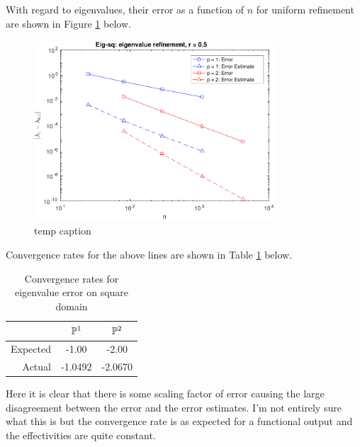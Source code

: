 \documentclass{article}
\begin{document}
\begin{itemize}
	
	With regard to eigenvalues, their error as a function of \(n\) for uniform refinement are shown in Figure \ref{templabel2} below.
	\begin{figure}[H]
		\centering
		\includegraphics[width=0.8\textwidth]{eigsq_eigval_adapt.pdf}
		\caption{temp caption}
		\label{templabel2}
	\end{figure}
	Convergence rates for the above lines are shown in Table \ref{tab:32} below.
	\begin{table}[H]
		\centering
		\begin{tabular}{r||c|c}
			& \(\mathbb{P}^1 \) & \(\mathbb{P}^2 \) \\
			\hline
			Expected & -1.00 & -2.00 \\
			\hline
			Actual & -1.0492 & -2.0670 \\
		\end{tabular}
		\caption{Convergence rates for eigenvalue error on square domain}
		\label{tab:32}
	\end{table}
	Here it is clear that there is some scaling factor of error causing the large disagreement between the error and the error estimates. I'm not entirely sure what this is but the convergence rate is as expected for a functional output and the effectivities are quite constant.
	

\end{itemize}
\end{document}
